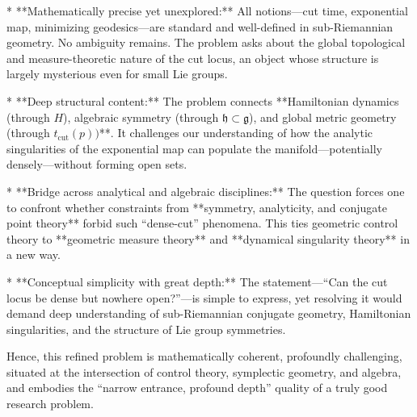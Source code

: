 * **Mathematically precise yet unexplored:** All notions—cut time, exponential map, minimizing geodesics—are standard and well-defined in sub-Riemannian geometry. No ambiguity remains. The problem asks about the global topological and measure-theoretic nature of the cut locus, an object whose structure is largely mysterious even for small Lie groups.

* **Deep structural content:** The problem connects **Hamiltonian dynamics (through \(H\)), algebraic symmetry (through \(\mathfrak{h}\subset\mathfrak{g}\)), and global metric geometry (through \(t_{\mathrm{cut}}(p))\)**. It challenges our understanding of how the analytic singularities of the exponential map can populate the manifold—potentially densely—without forming open sets.

* **Bridge across analytical and algebraic disciplines:** The question forces one to confront whether constraints from **symmetry, analyticity, and conjugate point theory** forbid such “dense-cut” phenomena. This ties geometric control theory to **geometric measure theory** and **dynamical singularity theory** in a new way.

* **Conceptual simplicity with great depth:** The statement—“Can the cut locus be dense but nowhere open?”—is simple to express, yet resolving it would demand deep understanding of sub-Riemannian conjugate geometry, Hamiltonian singularities, and the structure of Lie group symmetries.

Hence, this refined problem is mathematically coherent, profoundly challenging, situated at the intersection of control theory, symplectic geometry, and algebra, and embodies the “narrow entrance, profound depth” quality of a truly good research problem.